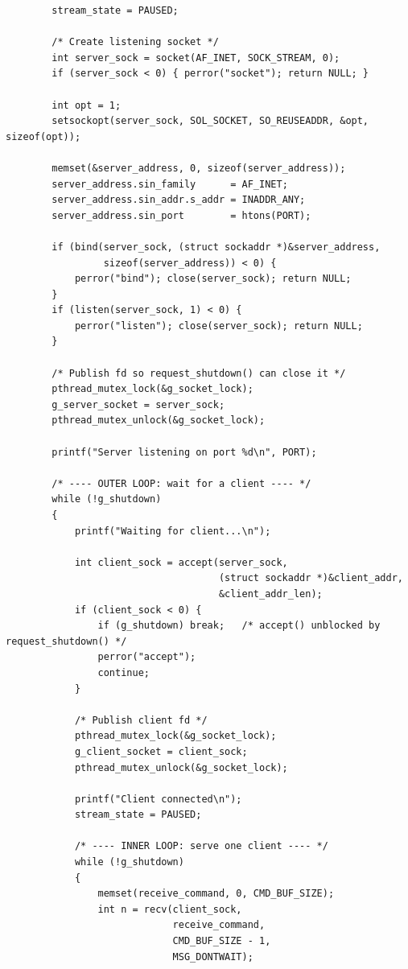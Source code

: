 \begin{verbatim}
        stream_state = PAUSED;
    
        /* Create listening socket */
        int server_sock = socket(AF_INET, SOCK_STREAM, 0);
        if (server_sock < 0) { perror("socket"); return NULL; }
    
        int opt = 1;
        setsockopt(server_sock, SOL_SOCKET, SO_REUSEADDR, &opt, sizeof(opt));
    
        memset(&server_address, 0, sizeof(server_address));
        server_address.sin_family      = AF_INET;
        server_address.sin_addr.s_addr = INADDR_ANY;
        server_address.sin_port        = htons(PORT);
    
        if (bind(server_sock, (struct sockaddr *)&server_address,
                 sizeof(server_address)) < 0) {
            perror("bind"); close(server_sock); return NULL;
        }
        if (listen(server_sock, 1) < 0) {
            perror("listen"); close(server_sock); return NULL;
        }
    
        /* Publish fd so request_shutdown() can close it */
        pthread_mutex_lock(&g_socket_lock);
        g_server_socket = server_sock;
        pthread_mutex_unlock(&g_socket_lock);
    
        printf("Server listening on port %d\n", PORT);
    
        /* ---- OUTER LOOP: wait for a client ---- */
        while (!g_shutdown)
        {
            printf("Waiting for client...\n");
    
            int client_sock = accept(server_sock,
                                     (struct sockaddr *)&client_addr,
                                     &client_addr_len);
            if (client_sock < 0) {
                if (g_shutdown) break;   /* accept() unblocked by request_shutdown() */
                perror("accept");
                continue;
            }
    
            /* Publish client fd */
            pthread_mutex_lock(&g_socket_lock);
            g_client_socket = client_sock;
            pthread_mutex_unlock(&g_socket_lock);
    
            printf("Client connected\n");
            stream_state = PAUSED;
    
            /* ---- INNER LOOP: serve one client ---- */
            while (!g_shutdown)
            {
                memset(receive_command, 0, CMD_BUF_SIZE);
                int n = recv(client_sock,
                             receive_command,
                             CMD_BUF_SIZE - 1,
                             MSG_DONTWAIT);
    

\end{verbatim}
